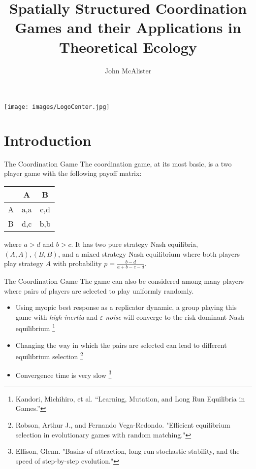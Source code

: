 \documentclass{beamer}
\title{Spatially Structured Coordination Games and their Applications in Theoretical Ecology}
\author{John McAlister}
\institute[Fefferman Lab]{Univeristy of Tennessee - Knoxville}
\begin{document}
	\begin{frame}[plain]
		\centering
		\maketitle
		\texttt{[image: images/LogoCenter.jpg]}
	\end{frame}
\section{Introduction}
\begin{frame}{The Coordination Game}
	The coordination game, at its most basic, is a two player game with the following payoff matrix:
	\begin{center} 
		\begin{tabular}{c|cc}
			&A&B\\
			\hline 
			A&a,a&c,d\\
			B&d,c&b,b
		\end{tabular}
	\end{center}
	
	where $a>d$ and $b>c$. It has two pure strategy Nash equilibria, $(A,A), (B,B)$, and a mixed strategy Nash equilibrium where both players play strategy $A$ with probability $p=\frac{b-d}{a+b-c-d}$.
\end{frame}
\begin{frame}{The Coordination Game}
	The game can also be considered among many players where pairs of players are selected to play uniformly randomly.
	\begin{itemize}
		\item Using myopic best response as a replicator dynamic, a group playing this game with \textit{high inertia} and $\varepsilon$\textit{-noise} will converge to the risk dominant Nash equilibrium \footnote{Kandori, Michihiro, et al. “Learning, Mutation, and Long Run Equilibria in Games.”}
		
		\item Changing the way in which the pairs are selected can lead to different equilibrium selection \footnote{Robson, Arthur J., and Fernando Vega-Redondo. "Efficient equilibrium selection in evolutionary games with random matching."}
		
		\item Convergence time is very slow \footnote{Ellison, Glenn. "Basins of attraction, long-run stochastic stability, and the speed of step-by-step evolution."}
	\end{itemize}
\end{frame}
\end{document}
